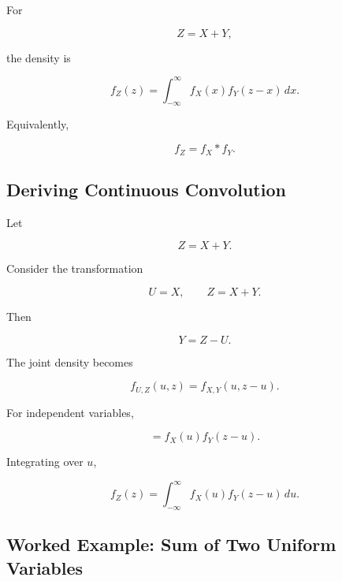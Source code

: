 For

\[
Z=X+Y,
\]

the density is

\[
\boxed{
f_Z(z)
=
\int_{-\infty}^{\infty}
f_X(x)
f_Y(z-x)
\,dx.
}
\]

Equivalently,

\[
\boxed{
f_Z
=
f_X*f_Y.
}
\]

\subsection{Deriving Continuous Convolution}
\label{subsec:derive-continuous-convolution}

Let

\[
Z=X+Y.
\]

Consider the transformation

\[
U=X,
\qquad
Z=X+Y.
\]

Then

\[
Y=Z-U.
\]

The joint density becomes

\[
f_{U,Z}(u,z)
=
f_{X,Y}(u,z-u).
\]

For independent variables,

\[
=
f_X(u)f_Y(z-u).
\]

Integrating over \(u\),

\[
\boxed{
f_Z(z)
=
\int_{-\infty}^{\infty}
f_X(u)f_Y(z-u)\,du.
}
\]

\subsection{Worked Example: Sum of Two Uniform Variables}
\label{subsec:worked-sum-uniform}

